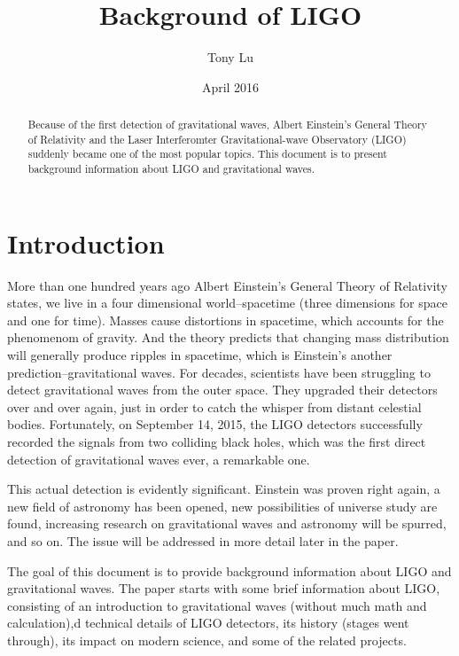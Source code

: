 \documentclass[aps,prl,preprint]{revtex4}
\begin{document}
\pagestyle{pioneer}
\date{April 2016}
\preprint{}
\title{Background of LIGO}
\author{Tony Lu}


\begin{abstract}
Because of the first detection of gravitational waves, Albert Einstein's General Theory of Relativity and the Laser Interferomter Gravitational-wave Observatory (LIGO) suddenly became one of the most popular topics. This document is to present background information about LIGO and gravitational waves.

\end{abstract}

\maketitle

\section{Introduction \label{intro}}
More than one hundred years ago Albert Einstein's General Theory of Relativity \cite{relativity1, relativity2} states, we live in a four dimensional world--spacetime (three dimensions for space and one for time). Masses cause distortions in spacetime, which accounts for the phenomenom of gravity. And the theory predicts that changing mass distribution will generally produce ripples in spacetime, which is Einstein's another prediction--gravitational waves. For decades, scientists have been struggling to detect gravitational waves from the outer space. They upgraded their detectors over and over again, just in order to catch the whisper from distant celestial bodies. Fortunately, on September 14, 2015, the LIGO detectors successfully recorded the signals from two colliding black holes, which was the first direct detection of gravitational waves ever, a remarkable one.  \cite{GW}

This actual detection is evidently significant. Einstein was proven right again, a new field of astronomy has been opened, new possibilities of universe study are found, increasing research on gravitational waves and astronomy will be spurred, and so on. The issue will be addressed in more detail later in the paper.

The goal of this document is to provide background information about LIGO and gravitational waves. The paper starts with some brief information about LIGO, consisting of an introduction to gravitational waves (without much math and calculation),d technical details of LIGO detectors, its history (stages went through), its impact on modern science, and some of the related projects.
\end{document}

